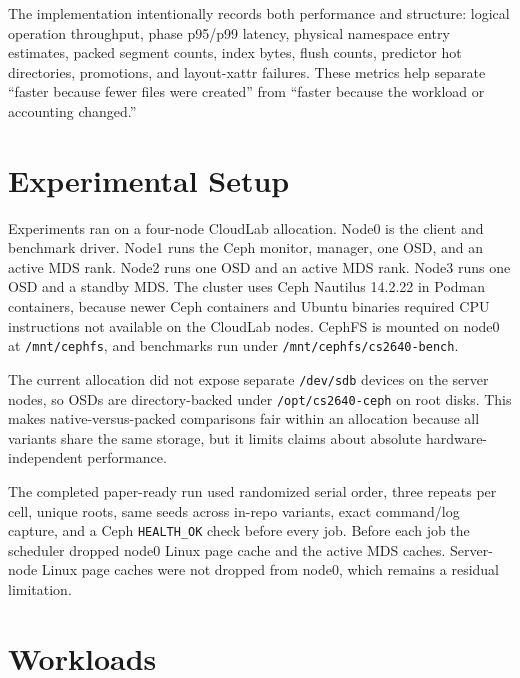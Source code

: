 \documentclass[letterpaper,twocolumn,10pt]{article}
\begin{document}
The implementation intentionally records both performance and structure:
logical operation throughput, phase p95/p99 latency, physical namespace entry
estimates, packed segment counts, index bytes, flush counts, predictor hot
directories, promotions, and layout-xattr failures. These metrics help separate
``faster because fewer files were created'' from ``faster because the workload
or accounting changed.''

\section{Experimental Setup}

Experiments ran on a four-node CloudLab allocation. Node0 is the client and
benchmark driver. Node1 runs the Ceph monitor, manager, one OSD, and an active
MDS rank. Node2 runs one OSD and an active MDS rank. Node3 runs one OSD and a
standby MDS. The cluster uses Ceph Nautilus 14.2.22 in Podman containers,
because newer Ceph containers and Ubuntu binaries required CPU instructions not
available on the CloudLab nodes. CephFS is mounted on node0 at
\texttt{/mnt/cephfs}, and benchmarks run under
\texttt{/mnt/cephfs/cs2640-bench}.

The current allocation did not expose separate \texttt{/dev/sdb} devices on the
server nodes, so OSDs are directory-backed under \texttt{/opt/cs2640-ceph} on
root disks. This makes native-versus-packed comparisons fair within an
allocation because all variants share the same storage, but it limits claims
about absolute hardware-independent performance.

The completed paper-ready run used randomized serial order, three repeats per
cell, unique roots, same seeds across in-repo variants, exact command/log
capture, and a Ceph \texttt{HEALTH\_OK} check before every job. Before each job
the scheduler dropped node0 Linux page cache and the active MDS caches.
Server-node Linux page caches were not dropped from node0, which remains a
residual limitation.

\section{Workloads}
\end{document}
